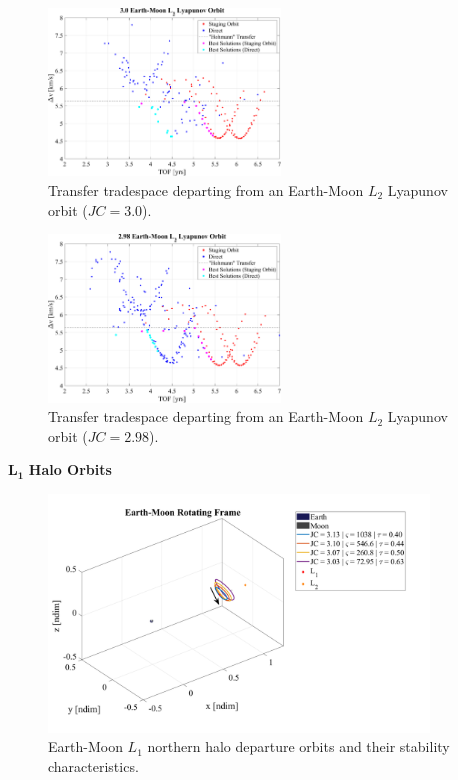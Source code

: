 \begin{figure}[ht]
    \centering
    \includegraphics[width=0.55\textwidth]{figures/TradeSpace_L2Lyapunov_3_00.pdf}
    \caption{Transfer tradespace departing from an Earth-Moon $L_{2}$ Lyapunov orbit ($JC=3.0$).}
\end{figure}

\begin{figure}[ht]
    \centering
    \includegraphics[width=0.55\textwidth]{figures/TradeSpace_L2Lyapunov_2_98.pdf}
    \caption{Transfer tradespace departing from an Earth-Moon $L_{2}$ Lyapunov orbit ($JC=2.98$).}
\end{figure}
\clearpage

$\pmb{L_{1}}$ \textbf{Halo Orbits}
\begin{figure}[ht]
    \centering
    \includegraphics[width=0.9\textwidth]{figures/L1HaloDepartureOrbits.pdf}
    \caption{Earth-Moon $L_{1}$ northern halo departure orbits and their stability characteristics.}
\end{figure}
\clearpage

